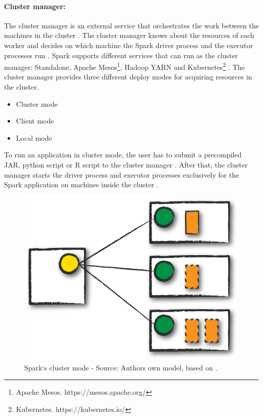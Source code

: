\paragraph{Cluster manager:}
The cluster manager is an external service that orchestrates the work between the machines in the cluster \cite{Hien2018Spark, Apache2020Spark}. The cluster manager knows about the resources of each worker and decides on which machine the Spark driver process and the executor processes run \cite{Hien2018Spark, Chambers2018Spark}.
Spark supports different services that can run as the cluster manager: Standalone, Apache Mesos\footnote{Apache Mesos. https://mesos.apache.org/}, Hadoop YARN\cite{Murthy2013Yarn} and Kubernetes\footnote{Kubernetes. https://kubernetes.io/} \cite{Apache2020Spark}.
The cluster manager provides three different deploy modes for acquiring resources in the cluster.
\begin{itemize}
\item Cluster mode
\item Client mode
\item Local mode
\end{itemize}

To run an application in cluster mode, the user has to submit a precompiled JAR, python script or R script to the cluster manager \cite{Chambers2018Spark}. After that, the cluster manager starts the driver process and executor processes exclusively for the Spark application on machines inside the cluster \cite{Chambers2018Spark, Hien2018Spark}.
\begin{figure}[h]%
\centering
\includegraphics[scale=0.5]{images/03_background/cluster_mode}%
\caption{Spark`s cluster mode - Source: Authors own model, based on \cite{Chambers2018Spark}.}%
\label{fig:spark_cluster_mode}%
\end{figure}

